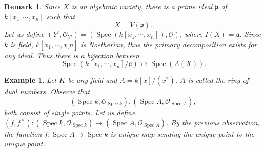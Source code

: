 \documentclass{article}
\newtheorem{remark}{Remark}[section]
\newtheorem{example}{Example}[section]
\numberwithin{equation}{section}
\DeclareMathOperator{\Spec}{Spec}
\newcommand*{\multivar}[2]{{#1_1,\cdots,#1_{#2}}}
\newcommand*{\ringedspacemorph}[1]{(#1,#1^{\#})}
\newcommand*{\sheaf}[2]{(#1,{\mathcal{#2}}_{#1})}
\begin{document}
\begin{remark}
Since $X$ is an algebraic variety, there is a prime ideal $\mathfrak{p}$ of $k[x_1,\cdots,x_n]$ such that
\begin{equation*}
X=V(\mathfrak{p}).
\end{equation*}
Let us define $\sheaf{Y'}{O}=(\Spec(k[\multivar{x}{n}]),\mathcal{O})$, where $I(X)=\mathfrak{a}$. Since $k$ is field, $k[\multivar{x},{n}]$ is Noetherian, thus the primary decomposition exists for any ideal. Thus there is a bijection between
\begin{equation*}
\Spec(k[\multivar{x}{n}]/\mathfrak{a}) \leftrightarrow \Spec(A(X)).
\end{equation*}
\end{remark}

\begin{example}
Let $K$ be any field and $A=k[x]/(x^2)$. $A$ is called the ring of dual numbers. Observe that
\begin{equation*}
\sheaf{\Spec k}{O},\sheaf{\Spec A}{O},
\end{equation*}
both consist of single points. Let us define $\ringedspacemorph{f}:\sheaf{\Spec k}{O}\to\sheaf{\Spec A}{O}$. By the previous observation, the function $f:\Spec A\to \Spec k$ is unique map sending the unique point to the unique point. 
\end{example}
\end{document}
